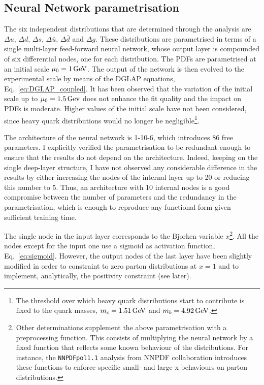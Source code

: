 \subsection*{Neural Network parametrisation}
The six independent distributions that are determined through the analysis are $\Delta u, \, \Delta d, \, \Delta s, \, \Delta \bar{u}, \, \Delta \bar{d}$ and $\Delta g$. These distributions are parametrised in terms of a single multi-layer feed-forward neural network, whose output layer is compounded of six differential nodes, one for each distribution. The PDFs are parametrised at an initial scale $\mu_0 = 1\,\textrm{GeV}$. The output of the network is then evolved to the experimental scale by means of the DGLAP equations, Eq.~\eqref{eq:DGLAP_coupled}. It has been observed that the variation of the initial scale up to $\mu_0 = 1.5\,\textrm{Gev}$ does not enhance the fit quality and the impact on PDFs is moderate. Higher values of the initial scale have not been considered, since heavy quark distributions would no longer be negligible\footnote{\footnotesize{The threshold over which heavy quark distributions start to contribute is fixed to the quark masses, $m_c=1.51\, \textrm{GeV}$ and $m_b=4.92\, \textrm{GeV}$.}}.%

The architecture of the neural network is 1-10-6, which introduces 86 free parameters. I explicitly verified the parametrisation to be redundant enough to ensure that the results do not depend on the architecture. Indeed, keeping on the single deep-layer structure, I have not observed any considerable difference in the results by either increasing the nodes of the internal layer up to 20 or reducing this number to 5. Thus, an architecture with 10 internal nodes is a good compromise between the number of parameters and the redundancy in the parametrisation, which is enough to reproduce any functional form given sufficient training time.%

The single node in the input layer corresponds to the Bjorken variable $x$\footnote{\footnotesize{Other determinations supplement the above parametrisation with a preprocessing function. This consists of multiplying the neural network by a fixed function that reflects some known behaviour of the distributions. For instance, the \texttt{NNPDFpol1.1} analysis from NNPDF collaboration \cite{Nocera:2014gqa} introduces these functions to enforce specific small- and large-x behaviours on parton distributions.}}. All the nodes except for the input one use a sigmoid as activation function, Eq.~\eqref{eq:sigmoid}. However, the output nodes of the last layer have been slightly modified in order to constraint to zero parton distributions at $x=1$ and to implement, analytically, the positivity constraint (see later).%

